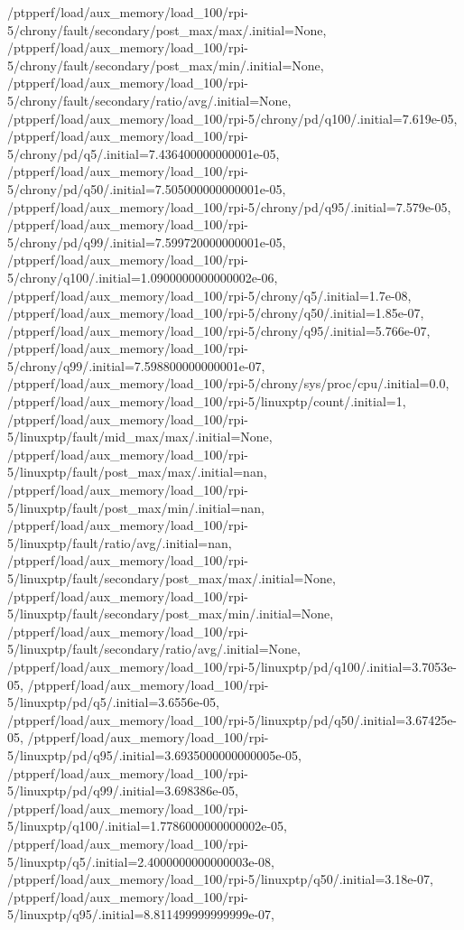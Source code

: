 {    /ptpperf/load/aux_memory/load_100/rpi-5/chrony/fault/secondary/post_max/max/.initial=None,
    /ptpperf/load/aux_memory/load_100/rpi-5/chrony/fault/secondary/post_max/min/.initial=None,
    /ptpperf/load/aux_memory/load_100/rpi-5/chrony/fault/secondary/ratio/avg/.initial=None,
    /ptpperf/load/aux_memory/load_100/rpi-5/chrony/pd/q100/.initial=7.619e-05,
    /ptpperf/load/aux_memory/load_100/rpi-5/chrony/pd/q5/.initial=7.436400000000001e-05,
    /ptpperf/load/aux_memory/load_100/rpi-5/chrony/pd/q50/.initial=7.505000000000001e-05,
    /ptpperf/load/aux_memory/load_100/rpi-5/chrony/pd/q95/.initial=7.579e-05,
    /ptpperf/load/aux_memory/load_100/rpi-5/chrony/pd/q99/.initial=7.599720000000001e-05,
    /ptpperf/load/aux_memory/load_100/rpi-5/chrony/q100/.initial=1.0900000000000002e-06,
    /ptpperf/load/aux_memory/load_100/rpi-5/chrony/q5/.initial=1.7e-08,
    /ptpperf/load/aux_memory/load_100/rpi-5/chrony/q50/.initial=1.85e-07,
    /ptpperf/load/aux_memory/load_100/rpi-5/chrony/q95/.initial=5.766e-07,
    /ptpperf/load/aux_memory/load_100/rpi-5/chrony/q99/.initial=7.598800000000001e-07,
    /ptpperf/load/aux_memory/load_100/rpi-5/chrony/sys/proc/cpu/.initial=0.0,
    /ptpperf/load/aux_memory/load_100/rpi-5/linuxptp/count/.initial=1,
    /ptpperf/load/aux_memory/load_100/rpi-5/linuxptp/fault/mid_max/max/.initial=None,
    /ptpperf/load/aux_memory/load_100/rpi-5/linuxptp/fault/post_max/max/.initial=nan,
    /ptpperf/load/aux_memory/load_100/rpi-5/linuxptp/fault/post_max/min/.initial=nan,
    /ptpperf/load/aux_memory/load_100/rpi-5/linuxptp/fault/ratio/avg/.initial=nan,
    /ptpperf/load/aux_memory/load_100/rpi-5/linuxptp/fault/secondary/post_max/max/.initial=None,
    /ptpperf/load/aux_memory/load_100/rpi-5/linuxptp/fault/secondary/post_max/min/.initial=None,
    /ptpperf/load/aux_memory/load_100/rpi-5/linuxptp/fault/secondary/ratio/avg/.initial=None,
    /ptpperf/load/aux_memory/load_100/rpi-5/linuxptp/pd/q100/.initial=3.7053e-05,
    /ptpperf/load/aux_memory/load_100/rpi-5/linuxptp/pd/q5/.initial=3.6556e-05,
    /ptpperf/load/aux_memory/load_100/rpi-5/linuxptp/pd/q50/.initial=3.67425e-05,
    /ptpperf/load/aux_memory/load_100/rpi-5/linuxptp/pd/q95/.initial=3.6935000000000005e-05,
    /ptpperf/load/aux_memory/load_100/rpi-5/linuxptp/pd/q99/.initial=3.698386e-05,
    /ptpperf/load/aux_memory/load_100/rpi-5/linuxptp/q100/.initial=1.7786000000000002e-05,
    /ptpperf/load/aux_memory/load_100/rpi-5/linuxptp/q5/.initial=2.4000000000000003e-08,
    /ptpperf/load/aux_memory/load_100/rpi-5/linuxptp/q50/.initial=3.18e-07,
    /ptpperf/load/aux_memory/load_100/rpi-5/linuxptp/q95/.initial=8.811499999999999e-07,
}
